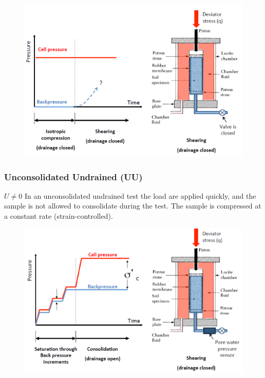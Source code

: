             \begin{figure}[h!]
            \center
                \includegraphics[scale=0.7]{Verastegui/images/V14.PNG}
            \end{figure}
            
        \subsubsection{Unconsolidated Undrained (UU)}
        
            \textbf{$U \ne 0$} 
            In an unconsolidated undrained test the load are applied quickly, and the sample is not allowed to consolidate during the test. The sample is compressed at a constant rate (strain-controlled).
            
            \begin{figure}[h!]
            \center
                \includegraphics[scale=0.7]{Verastegui/images/V15.PNG}
            \end{figure}
            
